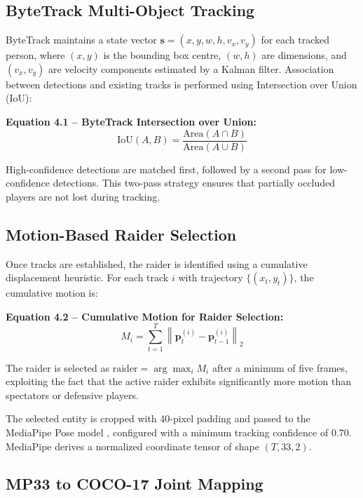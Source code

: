 \begin{sloppypar}
\subsection{ByteTrack Multi-Object Tracking}

ByteTrack maintains a state vector $\mathbf{s} = (x, y, w, h, v_x, v_y)$ for each tracked person, where $(x, y)$ is the bounding box centre, $(w, h)$ are dimensions, and $(v_x, v_y)$ are velocity components estimated by a Kalman filter. Association between detections and existing tracks is performed using Intersection over Union (IoU):

\textbf{Equation 4.1 -- ByteTrack Intersection over Union:}
\begin{equation}
\text{IoU}(A, B) = \frac{\text{Area}(A \cap B)}{\text{Area}(A \cup B)}
\tag{4.1}
\end{equation}

High-confidence detections are matched first, followed by a second pass for low-confidence detections. This two-pass strategy ensures that partially occluded players are not lost during tracking.

\subsection{Motion-Based Raider Selection}

Once tracks are established, the raider is identified using a cumulative displacement heuristic. For each track $i$ with trajectory $\{(x_t, y_t)\}$, the cumulative motion is:

\textbf{Equation 4.2 -- Cumulative Motion for Raider Selection:}
\begin{equation}
M_i = \sum_{t=1}^{T} \left\| \mathbf{p}_t^{(i)} - \mathbf{p}_{t-1}^{(i)} \right\|_2
\tag{4.2}
\end{equation}

The raider is selected as $\text{raider} = \arg\max_i M_i$ after a minimum of five frames, exploiting the fact that the active raider exhibits significantly more motion than spectators or defensive players.

The selected entity is cropped with 40-pixel padding and passed to the MediaPipe Pose model \cite{mediapipe_pose}, configured with a minimum tracking confidence of $0.70$. MediaPipe derives a normalized coordinate tensor of shape $(T, 33, 2)$.

\subsection{MP33 to COCO-17 Joint Mapping}


\end{sloppypar}

